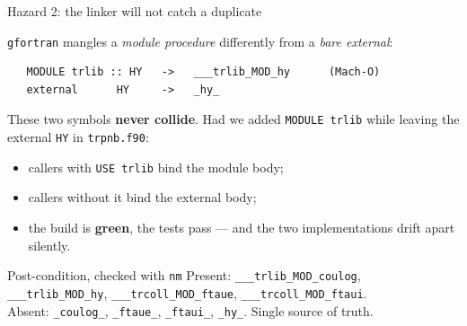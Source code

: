 \documentclass[10pt,aspectratio=169]{beamer}
\newcommand{\C}[1]{\texttt{\small #1}}          %
\newcommand{\good}{\textcolor{ok}{\textbf{green}}}
\begin{document}
\begin{frame}[fragile]{Hazard 2: the linker will not catch a duplicate}

\C{gfortran} mangles a \emph{module procedure} differently from a \emph{bare external}:

\begin{center}
\begin{minipage}{0.86\textwidth}
\footnotesize
\begin{verbatim}
   MODULE trlib :: HY   ->   ___trlib_MOD_hy      (Mach-O)
   external      HY     ->   _hy_
\end{verbatim}
\end{minipage}
\end{center}

\vspace{0.2em}
These two symbols \textbf{never collide}. Had we added \C{MODULE trlib} while leaving the external
\C{HY} in \C{trpnb.f90}:

\begin{itemize}
  \item callers with \C{USE trlib} bind the module body;
  \item callers without it bind the external body;
  \item the build is \good, the tests pass --- and the two implementations drift apart silently.
\end{itemize}

\vspace{0.3em}
\begin{exampleblock}{Post-condition, checked with \C{nm}}
\footnotesize
Present: \C{\_\_\_trlib\_MOD\_coulog}, \C{\_\_\_trlib\_MOD\_hy},
\C{\_\_\_trcoll\_MOD\_ftaue}, \C{\_\_\_trcoll\_MOD\_ftaui}.\\
Absent: \C{\_coulog\_}, \C{\_ftaue\_}, \C{\_ftaui\_}, \C{\_hy\_}. \quad Single source of truth.
\end{exampleblock}
\end{frame}
\end{document}
